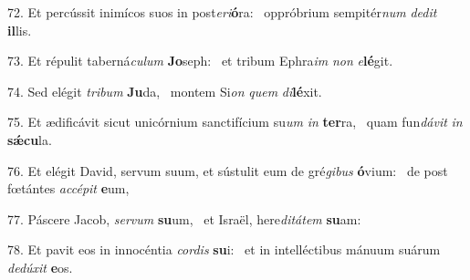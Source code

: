72. Et percússit inimícos suos in post\textit{e}\textit{ri}\textbf{ó}ra: \ast\  oppróbrium sempitér\textit{num} \textit{de}\textit{dit} \textbf{il}lis.\

73. Et répulit taberná\textit{cu}\textit{lum} \textbf{Jo}seph: \ast\  et tribum Ephra\textit{im} \textit{non} \textit{e}\textbf{lé}git.\

74. Sed elégit \textit{tri}\textit{bum} \textbf{Ju}da, \ast\  montem Si\textit{on} \textit{quem} \textit{di}\textbf{lé}xit.\

75. Et ædificávit sicut unicórnium sanctifícium su\textit{um} \textit{in} \textbf{ter}ra, \ast\  quam fun\textit{dá}\textit{vit} \textit{in} \textbf{sǽ}\textbf{cu}la.\

76. Et elégit David, servum suum, et sústulit eum de gré\textit{gi}\textit{bus} \textbf{ó}vium: \ast\  de post fœtántes \textit{ac}\textit{cé}\textit{pit} \textbf{e}um,\

77. Páscere Jacob, \textit{ser}\textit{vum} \textbf{su}um, \ast\  et Israël, here\textit{di}\textit{tá}\textit{tem} \textbf{su}am:\

78. Et pavit eos in innocéntia \textit{cor}\textit{dis} \textbf{su}i: \ast\  et in intelléctibus mánuum suárum \textit{de}\textit{dú}\textit{xit} \textbf{e}os.\

